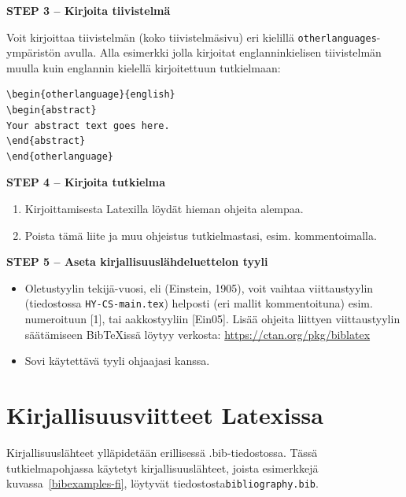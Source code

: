 {\textbf{STEP 3 -- Kirjoita tiivistelmä}}

Voit kirjoittaa tiivistelmän (koko tiivistelmäsivu) eri kielillä \texttt{otherlanguages}-ym\-pä\-ris\-tön avulla. Alla esimerkki jolla kirjoitat englanninkielisen tiivistelmän muulla kuin englannin kielellä kirjoitettuun tutkielmaan:

\begin{verbatim}
\begin{otherlanguage}{english} 
\begin{abstract}
Your abstract text goes here. 
\end{abstract} 
\end{otherlanguage}
\end{verbatim}


{\textbf{STEP 4 -- Kirjoita tutkielma}}

\begin{enumerate}
\item Kirjoittamisesta Latexilla löydät hieman ohjeita alempaa.
\item Poista tämä liite ja muu ohjeistus tutkielmastasi, esim. kommentoimalla.
\end{enumerate}

{\textbf{STEP 5 -- Aseta kirjallisuuslähdeluettelon tyyli}}

\begin{itemize}
\item Oletustyylin tekijä-vuosi, eli (Einstein, 1905), voit vaihtaa viittaustyylin (tiedostossa \texttt{HY-CS-main.tex}) helposti (eri mallit kommentoituna) esim. numeroituun [1], tai aakkostyyliin [Ein05].
Lisää ohjeita liittyen viittaustyylin säätämiseen {Bib}\TeX issä löytyy verkosta: \url{https://ctan.org/pkg/biblatex}
\item Sovi käytettävä tyyli ohjaajasi kanssa. 
\end{itemize}

\section{Kirjallisuusviitteet Latexissa}

Kirjallisuuslähteet ylläpidetään erillisessä .bib-tiedostossa. Tässä tutkielmapohjassa käy\-te\-tyt kirjallisuuslähteet, joista esimerkkejä kuvassa~\ref{bibexamples-fi}, löytyvät tiedostosta\newline \texttt{bibliography.bib}.

